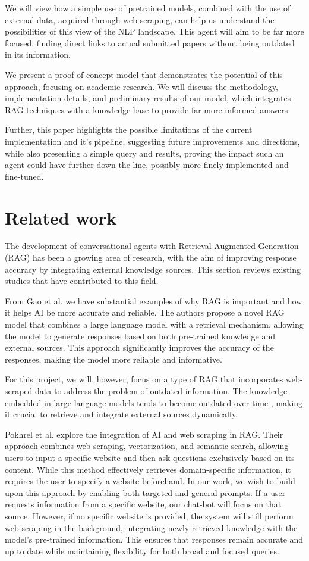 \documentclass[fleqn,moreauthors,10pt]{ds_report}
\begin{document}
We will view how a simple use of pretrained models, combined with the use of external data, acquired through web scraping, can help us understand the possibilities of this view of the NLP landscape. This agent will aim to be far more focused, finding direct links to actual submitted papers without being outdated in its information.

We present a proof-of-concept model that demonstrates the potential of this approach, focusing on academic research. We will discuss the methodology, implementation details, and preliminary results of our model, which integrates RAG techniques with a knowledge base to provide far more informed answers.

Further, this paper highlights the possible limitations of the current implementation and it's pipeline, suggesting future improvements and directions, while also presenting a simple query and results, proving the impact such an agent could have further down the line, possibly more finely implemented and fine-tuned.
\section*{Related work}
The development of conversational agents with Retrieval-Augmented Generation (RAG) has been a growing area of research, with the aim of improving response accuracy by integrating external knowledge sources. This section reviews existing studies that have contributed to this field.

From Gao et al. \cite{gao24} we have substantial examples of why RAG is important and how it helps AI be more accurate and reliable. The authors propose a novel RAG model that combines a large language model with a retrieval mechanism, allowing the model to generate responses based on both pre-trained knowledge and external sources. This approach significantly improves the accuracy of the responses, making the model more reliable and informative.

For this project, we will, however, focus on a type of RAG that incorporates web-scraped data to address the problem of outdated information. The knowledge embedded in large language models tends to become outdated over time \cite{he2022}, making it crucial to retrieve and integrate external sources dynamically.

Pokhrel et al. \cite{Pokhrel2025} explore the integration of AI and web scraping in RAG. Their approach combines web scraping, vectorization, and semantic search, allowing users to input a specific website and then ask questions exclusively based on its content. While this method effectively retrieves domain-specific information, it requires the user to specify a website beforehand. In our work, we wish to build upon this approach by enabling both targeted and general prompts. If a user requests information from a specific website, our chat-bot will focus on that source. However, if no specific website is provided, the system will still perform web scraping in the background, integrating newly retrieved knowledge with the model’s pre-trained information. This ensures that responses remain accurate and up to date while maintaining flexibility for both broad and focused queries.
\end{document}
